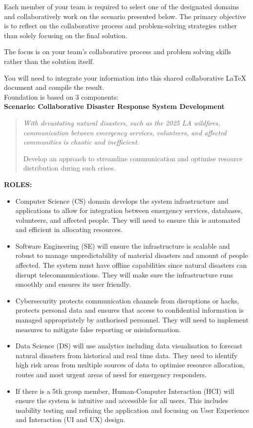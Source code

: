 \documentclass[a4paper, 11pt]{report}
\begin{document}
Each member of your team is required to select one of the designated domains and collaboratively work on the scenario presented below. The primary objective is to reflect on the collaborative process and problem-solving strategies rather than solely focusing on the final solution.

The focus is on your team’s collaborative process and problem solving skills rather than the solution itself. 

You will need to integrate your information into this shared collaborative LaTeX document and compile the result.\\[2mm]

Foundation is based on 3 components:\\[1mm]

\textbf{Scenario: Collaborative Disaster Response System Development}

{\begin{quote}\itshape
With devastating natural disasters, such as the 2025 LA wildfires, communication between emergency services, volunteers, and affected communities is chaotic and inefficient.

Develop an approach to streamline communication and optimise resource distribution during such crises. 
\end{quote}}

\textbf{ROLES:}
\begin{itemize}
    \item Computer Science (CS) domain develops the system infrastructure and applications to allow for integration between emergency services, databases, volunteers, and affected people. They will need to ensure this is automated and efficient in allocating resources.
    \item Software Engineering (SE) will ensure the infrastructure is scalable and robust to manage unpredictability of material disasters and amount of people affected. The system must have offline capabilities since natural disasters can disrupt telecommunications. They will make sure the infrastructure runs smoothly and ensures its user friendly.
    \item Cybersecurity protects communication channels from disruptions or hacks, protects personal data and ensures that access to confidential information is managed appropriately by authorised personnel. They will need to implement measures to mitigate false reporting or misinformation.
    \item Data Science (DS) will use analytics including data visualisation to forecast natural disasters from historical and real time data. They need to identify high risk areas from multiple sources of data to optimise resource allocation, routes and most urgent areas of need for emergency responders.
    \item If there is a 5th group member, Human-Computer Interaction (HCI) will ensure the system is intuitive and accessible for all users. This includes usability testing and refining the application and focusing on User Experience and Interaction (UI and UX) design.
\end{itemize}
\end{document}
